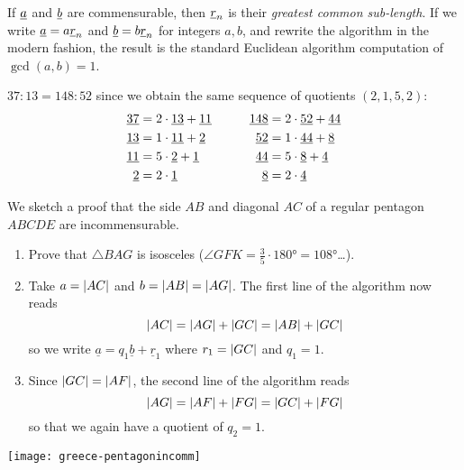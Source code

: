 
If $\underline a$ and $\underline b$ are commensurable, then $\underline r_n$ is their \emph{greatest common sub-length}. If we write $\underline a=a\underline r_n$ and $\underline b=b\underline r_n$ for integers $a,b$, and rewrite the algorithm in the modern fashion, the result is the standard Euclidean algorithm computation of $\gcd(a,b)=1$.

$37:13=148:52$ since we obtain the same sequence of quotients $(2,1,5,2)$:
\begin{align*}
	\underline{37}&=2\cdot\underline{13}+\underline{11}\qquad &\underline{148}&=2\cdot\underline{52}+\underline{44}\\
	\underline{13}&=1\cdot\underline{11}+\underline{2}\qquad &\underline{52}&=1\cdot\underline{44}+\underline{8}\\
	\underline{11}&=5\cdot\underline{2}+\underline{1}\qquad &\underline{44}&=5\cdot\underline{8}+\underline{4}\\
	\underline{2}&=2\cdot\underline{1}\qquad &\underline{8}&=2\cdot\underline{4}
\end{align*}

\goodbreak

\label{ex:theaetetus} We sketch a proof that the side $AB$ and diagonal $AC$ of a regular pentagon $ABCDE$ are incommensurable.\par
	\begin{minipage}[t]{0.65\linewidth}\vspace{-5pt}
	\begin{enumerate}\itemsep0pt
	  \item Prove that $\triangle BAG$ is isosceles ($\angle GFK=\frac 35\cdot\ang{180}=\ang{108}$\ldots).
	  \item Take $a=\left| AC\right|$ and $b=\left| AB\right|=\left| AG\right|$. The first line of the algorithm now reads
	  \[\left| AC\right|=\left| AG\right|+\left| GC\right|=\left| AB\right|+\left| GC\right|\]
	  so we write $\underline a=q_1\underline b+\underline r_1$ where $r_1=\left| GC\right|$ and $q_1=1$.
	  \item Since $\left| GC\right|=\left| AF\right|$, the second line of the algorithm reads
	  \[\left| AG\right|=\left| AF\right|+\left| FG\right|=\left| GC\right|+\left| FG\right|\]
	  so that we again have a quotient of $q_2=1$.
	\end{enumerate}
	\end{minipage}\begin{minipage}[t]{0.35\textwidth}\vspace{-5pt}
	\flushright\texttt{[image: greece-pentagonincomm]}
	\end{minipage}
	
